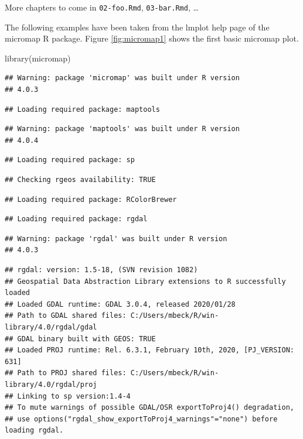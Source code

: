\documentclass[
]{krantz}
\makeatletter
\newenvironment{Shaded}{\begin{snugshade}}{\end{snugshade}}
\newcommand{\FunctionTok}[1]{\textcolor[rgb]{0,0,0}{#1}}
\newcommand{\NormalTok}[1]{#1}
\newenvironment{kframe}{%
\medskip{}
\setlength{\fboxsep}{.8em}
 \def\at@end@of@kframe{}%
 \ifinner\ifhmode%
  \def\at@end@of@kframe{\end{minipage}}%
  \begin{minipage}{\columnwidth}%
 \fi\fi%
 \def\FrameCommand##1{\hskip\@totalleftmargin \hskip-\fboxsep
 \colorbox{shadecolor}{##1}\hskip-\fboxsep
     \hskip-\linewidth \hskip-\@totalleftmargin \hskip\columnwidth}%
 \MakeFramed {\advance\hsize-\width
   \@totalleftmargin\z@ \linewidth\hsize
   \@setminipage}}%
 {\par\unskip\endMakeFramed%
 \at@end@of@kframe}
\renewenvironment{Shaded}{\begin{kframe}}{\end{kframe}}
\makeatother
\begin{document}
More chapters to come in \texttt{02-foo.Rmd}, \texttt{03-bar.Rmd}, \ldots{}

The following examples have been taken from the lmplot help page of the micromap R package.
Figure \ref{fig:micromap1} shows the first basic micromap plot.

\begin{Shaded}
\begin{Highlighting}[]
\FunctionTok{library}\NormalTok{(micromap)}
\end{Highlighting}
\end{Shaded}

\begin{verbatim}
## Warning: package 'micromap' was built under R version
## 4.0.3
\end{verbatim}

\begin{verbatim}
## Loading required package: maptools
\end{verbatim}

\begin{verbatim}
## Warning: package 'maptools' was built under R version
## 4.0.4
\end{verbatim}

\begin{verbatim}
## Loading required package: sp
\end{verbatim}

\begin{verbatim}
## Checking rgeos availability: TRUE
\end{verbatim}

\begin{verbatim}
## Loading required package: RColorBrewer
\end{verbatim}

\begin{verbatim}
## Loading required package: rgdal
\end{verbatim}

\begin{verbatim}
## Warning: package 'rgdal' was built under R version
## 4.0.3
\end{verbatim}

\begin{verbatim}
## rgdal: version: 1.5-18, (SVN revision 1082)
## Geospatial Data Abstraction Library extensions to R successfully loaded
## Loaded GDAL runtime: GDAL 3.0.4, released 2020/01/28
## Path to GDAL shared files: C:/Users/mbeck/R/win-library/4.0/rgdal/gdal
## GDAL binary built with GEOS: TRUE 
## Loaded PROJ runtime: Rel. 6.3.1, February 10th, 2020, [PJ_VERSION: 631]
## Path to PROJ shared files: C:/Users/mbeck/R/win-library/4.0/rgdal/proj
## Linking to sp version:1.4-4
## To mute warnings of possible GDAL/OSR exportToProj4() degradation,
## use options("rgdal_show_exportToProj4_warnings"="none") before loading rgdal.
\end{verbatim}
\end{document}
